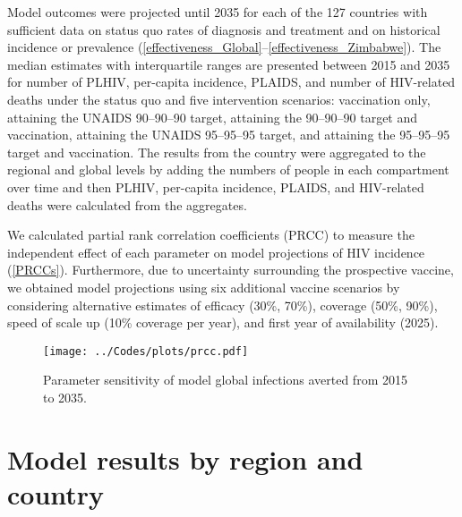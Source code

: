 \documentclass[11pt]{article}
\begin{document}
Model outcomes were projected until 2035 for each of the 127 countries
with sufficient data on status quo rates of diagnosis and treatment
and on historical incidence or prevalence
(\hyperref[effectiveness_Global]{\autoref*{effectiveness_Global}}--\ref{effectiveness_Zimbabwe}). The
median estimates with interquartile ranges are presented between 2015
and 2035 for number of PLHIV, per-capita incidence, PLAIDS, and number
of HIV-related deaths under the status quo and five intervention
scenarios: vaccination only, attaining the UNAIDS 90--90--90 target,
attaining the 90--90--90 target and vaccination, attaining the UNAIDS
95--95--95 target, and attaining the 95--95--95 target and
vaccination.  The results from the country were aggregated to the
regional and global levels by adding the numbers of people in each
compartment over time and then PLHIV, per-capita incidence, PLAIDS,
and HIV-related deaths were calculated from the aggregates.

We calculated partial rank correlation coefficients (PRCC)
\cite{blower1994} to measure the independent effect of each parameter
on model projections of HIV incidence (\autoref{PRCCs}). Furthermore,
due to uncertainty surrounding the prospective vaccine, we obtained
model projections using six additional vaccine scenarios by
considering alternative estimates of efficacy (30\%, 70\%), coverage
(50\%, 90\%), speed of scale up (10\% coverage per year), and first
year of availability (2025).

\begin{figure}
  \centering
  \texttt{[image: ../Codes/plots/prcc.pdf]}
  \caption{Parameter sensitivity of model global infections averted
    from 2015 to 2035.}
  \label{PRCCs}
\end{figure}


\clearpage




\appendix
\newpage
\vspace*{3in}
\section{Model results by region and country}
\newpage

\end{document}
